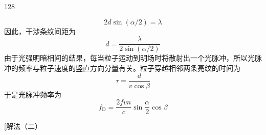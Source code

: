 \begin{solution}{128}
\begin{subsolution}
        \begin{equation}
            2 d \sin (\alpha / 2) = \lambda
            \label{eq:14.s128}
        \end{equation}
        因此，干涉条纹间距为
        \begin{equation}
            d = \frac {\lambda}{2 \sin (\alpha / 2)}
            \label{eq:15.s128}
        \end{equation}
        由于光强明暗相间的结果，每当粒子运动到明场时将散射出一个光脉冲，所以光脉冲的频率与粒子速度的竖直方向分量有关。粒子穿越相邻两条亮纹的时间为
        \begin{equation}
            \tau = \frac {d}{v \cos \beta}
            \label{eq:16.s128}
        \end{equation}
        于是光脉冲频率为
        \begin{equation}
            f _ {\mathrm{D}} = \frac {2 f v n}{c} \sin \frac {\alpha}{2} \cos \beta
            \label{eq:17.s128}
        \end{equation}

        [解法（二）


\end{subsolution}
\end{solution}
